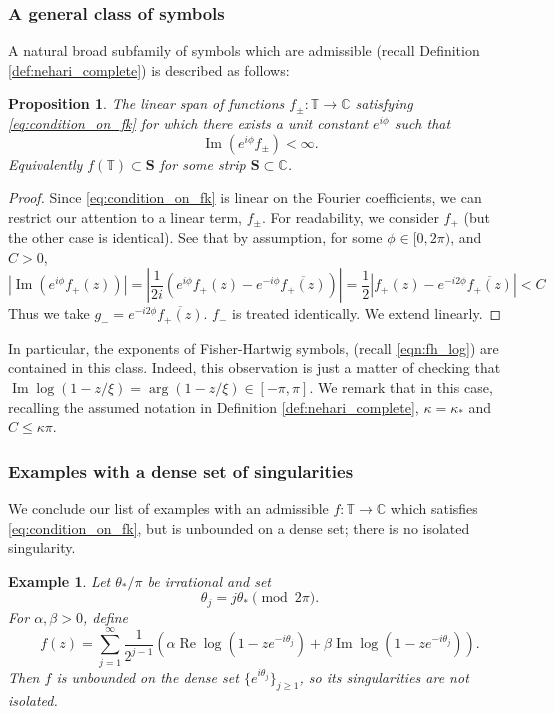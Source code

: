 \documentclass[11pt]{amsart}
\theoremstyle{plain}
\newtheorem{example}[theorem]{Example}
\newtheorem{proposition}[theorem]{Proposition}
\theoremstyle{remark}
\renewcommand{\Im}{\mathop{\mathrm{Im}}}
\numberwithin{equation}{section}
\begin{document}
\subsubsection{A general class of symbols}
A natural broad subfamily of symbols which are admissible (recall Definition \ref{def:nehari_complete}) is described as follows:
\begin{proposition}\label{ex:strip_support}
The linear span of functions 
$f_{\pm}:\mathbb{T}\rightarrow\mathbb{C}$
%
%
satisfying \eqref{eq:condition_on_fk} for 
which there exists a unit constant $e^{i\phi}$ such that 
$$\Im(e^{i\phi}f_{\pm})<\infty.$$
Equivalently $f(\mathbb{T})\subset \mathbf{S}$ for some strip $\mathbf{S}\subset\mathbb{C}$.
\end{proposition}
\begin{proof}
Since \eqref{eq:condition_on_fk} is linear on the Fourier coefficients, we can restrict our attention to a linear term, $f_{\pm}$. For readability, we consider $f_+$ (but the other case is identical). See that by assumption, for some $\phi\in[0,2\pi)$, and $C>0$,
\begin{equation}
|\Im(e^{i\phi}f_+(z))|
=
\left|\frac{1}{2i}(e^{i\phi}f_+(z)-e^{-i\phi}\overline{f_+(z)})\right|
=\frac{1}{2}\left| f_+(z)- e^{-i2\phi}\overline{f_+(z)} \right|
< C
\end{equation}
Thus we take $g_-=e^{-i2\phi}\overline{f_+(z)}$. $f_-$ is treated identically. We extend  linearly. 

\end{proof}

In particular,
the exponents of Fisher-Hartwig symbols, (recall \eqref{eqn:fh_log}) are contained in this class. Indeed, this observation is just a matter of checking that 
$\Im \log(1-z/\xi)=\arg (1-z/\xi)\in [-\pi, \pi]$.
We remark that in this case, recalling the assumed notation in Definition \ref{def:nehari_complete}, $\kappa=\kappa_*$ and $C\leq \kappa\pi$. 
%
%
%
%
\subsubsection{Examples with a dense set of singularities}
We conclude our list of examples with an admissible $f:\mathbb{T}\rightarrow \mathbb{C}$ which satisfies \eqref{eq:condition_on_fk}, but is unbounded on a dense set; there is no isolated singularity.

\begin{example}\label{ex:long_example}
Let $\theta_*/\pi$ be irrational and set
\[
\theta_j=j\theta_* \pmod{2\pi}.
\]
For $\alpha,\beta>0$, define
\[
f(z)
=
\sum_{j=1}^{\infty}\frac{1}{2^{j-1}}
\left(
\alpha \operatorname{Re}\log(1-ze^{-i\theta_j})
+
\beta \operatorname{Im}\log(1-ze^{-i\theta_j})
\right).
\]
Then $f$ is unbounded on the dense set
$\{e^{i\theta_j}\}_{j\geq 1}$, so its singularities are not isolated.
\end{example}
\end{document}

